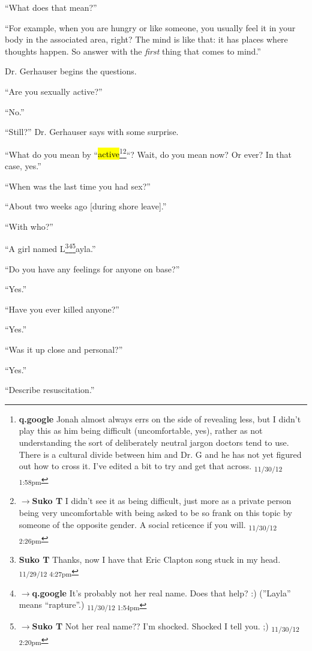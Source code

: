 ``What does that mean?''

``For example, when you are hungry or like someone, you usually feel it in your body in the associated area, right?  The mind is like that: it has places where thoughts happen. So answer with the \textit{first} thing that comes to mind.''

Dr. Gerhauser begins the questions.

``Are you sexually active?''

``No.''

``Still?'' Dr. Gerhauser says with some surprise.

``What do you mean by ``\hl{active}\footnote{\textbf{q.google }Jonah almost always errs on the side of revealing less, but I didn't play this as him being difficult (uncomfortable, yes), rather as not understanding the sort of deliberately neutral jargon doctors tend to use.  There is a cultural divide between him and Dr. G and he has not yet figured out how to cross it.  I've edited a bit to try and get that across. \textsubscript{11/30/12 1:58pm}}\footnote{$\rightarrow$\textbf{Suko T }I didn't see it as being difficult, just more as a private person being very uncomfortable with being asked to be so frank on this topic by someone of the opposite gender.  A social reticence if you will. \textsubscript{11/30/12 2:26pm}}``?  Wait, do you mean now?  Or ever?  In that case, yes.''

``When was the last time you had sex?''

``About two weeks ago {[}during shore leave{]}.''

``With who?''

``A girl named L\footnote{\textbf{Suko T }Thanks, now I have that Eric Clapton song stuck in my head. \textsubscript{11/29/12 4:27pm}}\footnote{$\rightarrow$\textbf{q.google }It's probably not her real name.  Does that help? :)
(''Layla'' means ``rapture''.) \textsubscript{11/30/12 1:54pm}}\footnote{$\rightarrow$\textbf{Suko T }Not her real name??  I'm shocked.  Shocked I tell you. ;) \textsubscript{11/30/12 2:20pm}}ayla.''

``Do you have any feelings for anyone on base?''

``Yes.''

``Have you ever killed anyone?''

``Yes.''

``Was it up close and personal?''

``Yes.''

``Describe resuscitation.''  


